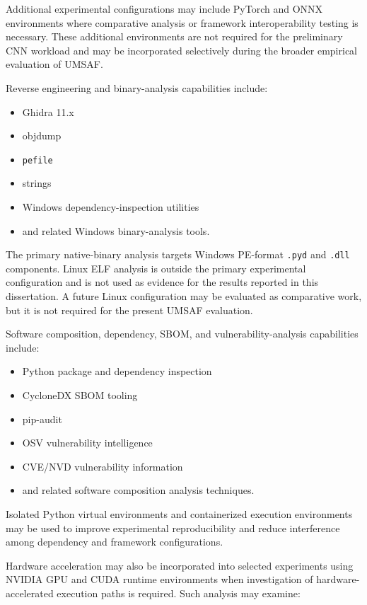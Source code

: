 \documentclass[
  12pt,
  letterpaper,
  oneside]{report}
\providecommand{\tightlist}{%
  \setlength{\itemsep}{0pt}\setlength{\parskip}{0pt}}
\begin{document}
Additional experimental configurations may include PyTorch and ONNX
environments where comparative analysis or framework interoperability
testing is necessary. These additional environments are not required for
the preliminary CNN workload and may be incorporated selectively during
the broader empirical evaluation of UMSAF.

Reverse engineering and binary-analysis capabilities include:

\begin{itemize}
\tightlist
\item
  Ghidra 11.x
\item
  objdump
\item
  \texttt{pefile}
\item
  strings
\item
  Windows dependency-inspection utilities
\item
  and related Windows binary-analysis tools.
\end{itemize}

The primary native-binary analysis targets Windows PE-format
\texttt{.pyd} and \texttt{.dll} components. Linux ELF analysis is
outside the primary experimental configuration and is not used as
evidence for the results reported in this dissertation. A future Linux
configuration may be evaluated as comparative work, but it is not
required for the present UMSAF evaluation.

Software composition, dependency, SBOM, and vulnerability-analysis
capabilities include:

\begin{itemize}
\tightlist
\item
  Python package and dependency inspection
\item
  CycloneDX SBOM tooling
\item
  pip-audit
\item
  OSV vulnerability intelligence
\item
  CVE/NVD vulnerability information
\item
  and related software composition analysis techniques.
\end{itemize}

Isolated Python virtual environments and containerized execution
environments may be used to improve experimental reproducibility and
reduce interference among dependency and framework configurations.

Hardware acceleration may also be incorporated into selected experiments
using NVIDIA GPU and CUDA runtime environments when investigation of
hardware-accelerated execution paths is required. Such analysis may
examine:
\end{document}
